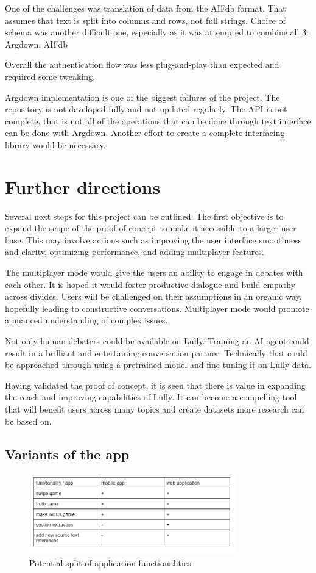 \documentclass{report}
\begin{document}
One of the challenges was translation of data from the AIFdb format. That assumes that text is split into columns and rows, not full strings.
Choice of schema was another difficult one, especially as it was attempted to combine all 3: Argdown, AIFdb
\cite{abbott_internet_2016}

Overall the authentication flow was less plug-and-play than expected and required some tweaking. 

Argdown implementation is one of the biggest failures of the project. The repository is not developed fully and not updated regularly. The API is not complete, that is not all of the operations that can be done through text interface can be done with Argdown. Another effort to create a complete interfacing library would be necessary.

\section{Further directions}
Several next steps for this project can be outlined. The first objective is to expand the scope of the proof of concept to make it accessible to a larger user base. This may involve actions such as improving the user interface smoothness and clarity, optimizing performance, and adding multiplayer features.

The multiplayer mode would give the users an ability to engage in debates with each other. It is hoped it would foster productive dialogue and build empathy across divides.
Users will be challenged on their assumptions in an organic way, hopefully leading to constructive conversations. Multiplayer mode would promote a nuanced understanding of complex issues.

Not only human debaters could be available on Lully. Training an AI agent could result in a brilliant and entertaining conversation partner. Technically that could be approached through using a pretrained model and fine-tuning it on Lully data.

Having validated the proof of concept, it is seen that there is value in expanding the reach and improving capabilities of Lully. It can become a compelling tool that will benefit users across many topics and create datasets more research can be based on.

\subsection{Variants of the app}
\begin{figure}[h]
    \centering
    \includegraphics[width=0.8\textwidth]{./images/web-app-split.png}
    \caption{Potential split of application functionalities}
\end{figure}
\end{document}

